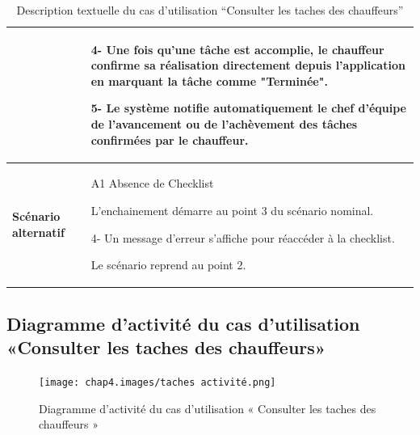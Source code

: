 \begin{table}[htbp]
  \centering
  \renewcommand{\arraystretch}{1.7} %
  \begin{tabular}{|p{4cm}|p{9cm}|}

                                 & 4- Une fois qu’une tâche est accomplie, le chauffeur confirme sa réalisation directement depuis l’application en marquant la tâche comme "Terminée". \newline

    5- Le système notifie automatiquement le chef d’équipe de l’avancement ou de l’achèvement des tâches confirmées par le chauffeur.                                                            \\


    \hline
    \textbf{Scénario alternatif} & A1 Absence de Checklist \newline

    L'enchainement démarre au point 3 du scénario nominal.\newline

    4- Un message d'erreur s'affiche pour réaccéder à la checklist. \newline

    Le scénario reprend au point 2.                                                                                                                                                              \\                                                                                                                                                        

    \hline
  \end{tabular}
  \caption{Description textuelle du cas d’utilisation “Consulter les taches des chauffeurs”}

\end{table}


\newpage
\subsection{Diagramme d'activité du cas d’utilisation «Consulter les taches des chauffeurs» }

\begin{figure}[ht!]
  \centering
  \texttt{[image: chap4.images/taches activité.png]}
  \caption{ Diagramme d'activité du cas d’utilisation « Consulter les taches des chauffeurs » }
\end{figure}



